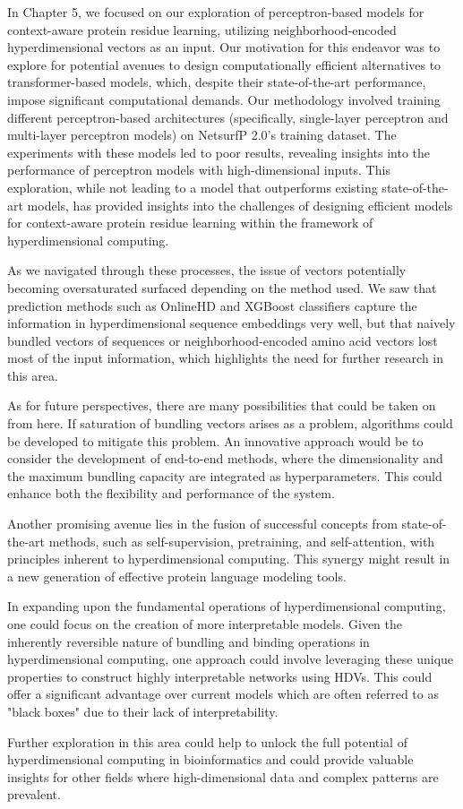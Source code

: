 In Chapter 5, we focused on our exploration of perceptron-based models for context-aware protein residue learning, utilizing neighborhood-encoded hyperdimensional vectors as an input. Our motivation for this endeavor was to explore for potential avenues to design computationally efficient alternatives to transformer-based models, which, despite their state-of-the-art performance, impose significant computational demands. Our methodology involved training different perceptron-based architectures (specifically, single-layer perceptron and multi-layer perceptron models) on NetsurfP 2.0's training dataset. The experiments with these models led to poor results, revealing insights into the performance of perceptron models with high-dimensional inputs. This exploration, while not leading to a model that outperforms existing state-of-the-art models, has provided insights into the challenges of designing efficient models for context-aware protein residue learning within the framework of hyperdimensional computing.

As we navigated through these processes, the issue of vectors potentially becoming oversaturated surfaced depending on the method used. We saw that prediction methods such as OnlineHD and XGBoost classifiers capture the information in hyperdimensional sequence embeddings very well, but that naively bundled vectors of sequences or neighborhood-encoded amino acid vectors lost most of the input information, which highlights the need for further research in this area.

As for future perspectives, there are many possibilities that could be taken on from here. If saturation of bundling vectors arises as a problem, algorithms could be developed to mitigate this problem. An innovative approach would be to consider the development of end-to-end methods, where the dimensionality and the maximum bundling capacity are integrated as hyperparameters. This could enhance both the flexibility and performance of the system.

Another promising avenue lies in the fusion of successful concepts from state-of-the-art methods, such as self-supervision, pretraining, and self-attention, with principles inherent to hyperdimensional computing. This synergy might result in a new generation of effective protein language modeling tools.

In expanding upon the fundamental operations of hyperdimensional computing, one could focus on the creation of more interpretable models. Given the inherently reversible nature of bundling and binding operations in hyperdimensional computing, one approach could involve leveraging these unique properties to construct highly interpretable networks using HDVs. This could offer a significant advantage over current models which are often referred to as "black boxes" due to their lack of interpretability.

Further exploration in this area could help to unlock the full potential of hyperdimensional computing in bioinformatics and could provide valuable insights for other fields where high-dimensional data and complex patterns are prevalent.